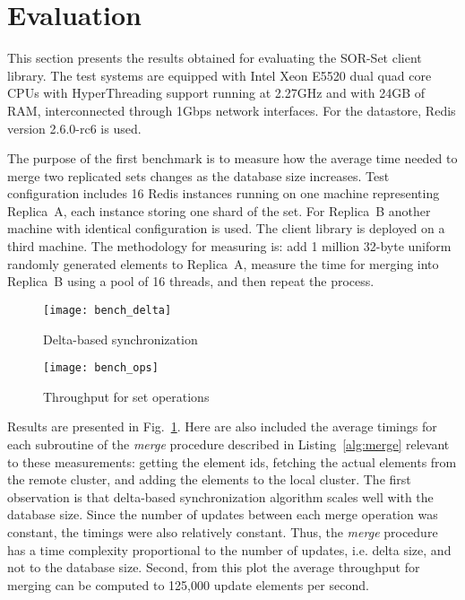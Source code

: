 \section{Evaluation}
\label{sec:evaluation}

This section presents the results obtained for evaluating the SOR-Set client
library. The test systems are equipped with Intel Xeon E5520 dual quad core
CPUs with HyperThreading support running at 2.27GHz and with 24GB of RAM,
interconnected through 1Gbps network interfaces. For the datastore, Redis
version 2.6.0-rc6 is used.

The purpose of the first benchmark is to measure how the average time needed to
merge two replicated sets changes as the database size increases. Test
configuration includes 16 Redis instances running on one machine representing
Replica~A, each instance storing one shard of the set. For Replica~B another
machine with identical configuration is used. The client library is deployed
on a third machine. The methodology for measuring is: add 1 million 32-byte
uniform randomly generated elements to Replica~A, measure the time for merging
into Replica~B using a pool of 16 threads, and then repeat the process.

\begin{figure}[t]
  \centering
  \begin{minipage}{1\linewidth}
    \centering
    \texttt{[image: bench\_delta]}
    \caption{Delta-based synchronization}
    \label{fig:bench_delta}
  \end{minipage}
\end{figure}

\begin{figure}[t]
  \centering
  \begin{minipage}{1\linewidth}
    \centering
    \texttt{[image: bench\_ops]}
    \caption{Throughput for set operations}
    \label{fig:bench_ops}
  \end{minipage}
\end{figure}

Results are presented in Fig.~\ref{fig:bench_delta}. Here are also included
the average timings for each subroutine  of the \textit{merge} procedure
described in Listing~\ref{alg:merge} relevant to these measurements:
getting the element ids, fetching the actual elements from the remote
cluster, and adding the elements to the local cluster. The first observation is
that delta-based synchronization algorithm scales well with the database size.
Since the number of updates between each merge operation was constant, the
timings were also relatively constant. Thus, the \textit{merge} procedure has a
time complexity proportional to the number of updates, i.e. delta size, and not
to the database size. Second, from this plot the average throughput for merging
can be computed to 125,000 update elements per second.

